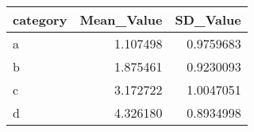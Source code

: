 \begin{table}[!h]
\centering
\begin{tabular}{lrr}
\toprule
category & Mean\_Value & SD\_Value\\
\midrule
a & 1.107498 & 0.9759683\\
b & 1.875461 & 0.9230093\\
c & 3.172722 & 1.0047051\\
d & 4.326180 & 0.8934998\\
\bottomrule
\end{tabular}
\end{table}
